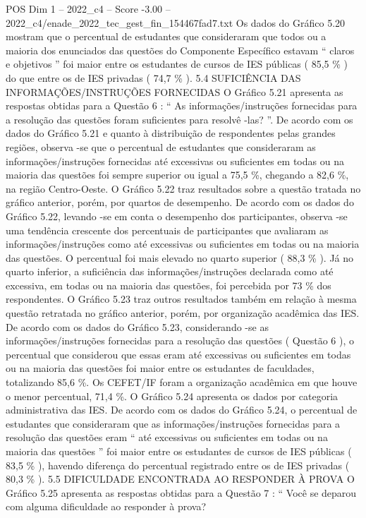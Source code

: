 \begin{textsample}{POS Dim 1 – 2022\_c4 – Score -3.00 – 2022\_c4/enade\_2022\_tec\_gest\_fin\_154467fad7.txt}
Os dados do Gráfico 5.20 mostram que o percentual de estudantes que consideraram que todos ou a maioria dos enunciados das questões do Componente Específico estavam “ claros e objetivos ” foi maior entre os estudantes de cursos de IES públicas ( 85,5 \% ) do que entre os de IES privadas ( 74,7 \% ). 5.4 SUFICIÊNCIA DAS INFORMAÇÕES/INSTRUÇÕES FORNECIDAS O Gráfico 5.21 apresenta as respostas obtidas para a Questão 6 : “ As informações/instruções fornecidas para a resolução das questões foram suficientes para resolvê -las? ”.
De acordo com os dados do Gráfico 5.21 e quanto à distribuição de respondentes pelas grandes regiões, observa -se que o percentual de estudantes que consideraram as informações/instruções fornecidas até excessivas ou suficientes em todas ou na maioria das questões foi sempre superior ou igual a 75,5 \%, chegando a 82,6 \%, na região Centro-Oeste.
O Gráfico 5.22 traz resultados sobre a questão tratada no gráfico anterior, porém, por quartos de desempenho.
De acordo com os dados do Gráfico 5.22, levando -se em conta o desempenho dos participantes, observa -se uma tendência crescente dos percentuais de participantes que avaliaram as informações/instruções como até excessivas ou suficientes em todas ou na maioria das questões.
O percentual foi mais elevado no quarto superior ( 88,3 \% ).
Já no quarto inferior, a suficiência das informações/instruções declarada como até excessiva, em todas ou na maioria das questões, foi percebida por 73 \% dos respondentes.
O Gráfico 5.23 traz outros resultados também em relação à mesma questão retratada no gráfico anterior, porém, por organização acadêmica das IES.
De acordo com os dados do Gráfico 5.23, considerando -se as informações/instruções fornecidas para a resolução das questões ( Questão 6 ), o percentual que considerou que essas eram até excessivas ou suficientes em todas ou na maioria das questões foi maior entre os estudantes de faculdades, totalizando 85,6 \%.
Os CEFET/IF foram a organização acadêmica em que houve o menor percentual, 71,4 \%.
O Gráfico 5.24 apresenta os dados por categoria administrativa das IES.
De acordo com os dados do Gráfico 5.24, o percentual de estudantes que consideraram que as informações/instruções fornecidas para a resolução das questões eram “ até excessivas ou suficientes em todas ou na maioria das questões ” foi maior entre os estudantes de cursos de IES públicas ( 83,5 \% ), havendo diferença do percentual registrado entre os de IES privadas ( 80,3 \% ). 5.5 DIFICULDADE ENCONTRADA AO RESPONDER À PROVA O Gráfico 5.25 apresenta as respostas obtidas para a Questão 7 : “ Você se deparou com alguma dificuldade ao responder à prova?

\end{textsample}
